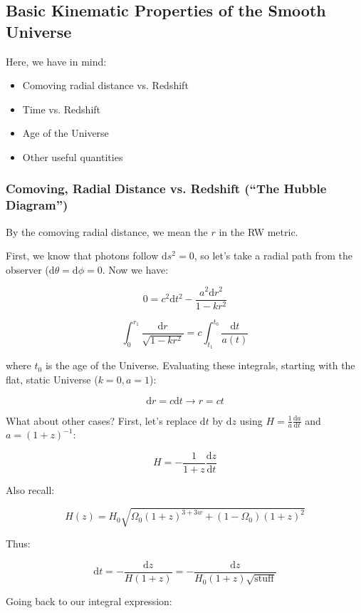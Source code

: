 \documentclass{article}
\newcommand{\be}{\begin{equation}}
\newcommand{\ee}{\end{equation}}
\begin{document}
\subsection{Basic Kinematic Properties of the Smooth Universe}

Here, we have in mind:

\begin{itemize}
    \item Comoving radial distance vs. Redshift
    \item Time vs. Redshift
    \item Age of the Universe
    \item Other useful quantities
\end{itemize}

\subsubsection{Comoving, Radial Distance vs. Redshift (``The Hubble Diagram'')}

By the comoving radial distance, we mean the $r$ in the RW metric. 

First, we know that photons follow $\mathrm{d}s^2 = 0$, so let's take a radial path from the observer ($\mathrm{d}\theta = \mathrm{d}\phi = 0$. Now we have:

\be
0 = c^2 \mathrm{d}t^2 - \frac{a^2 \mathrm{d}r^2}{1-kr^2}
\ee

\be
\int_{0}^{r_1} \frac{\mathrm{d}r}{\sqrt{1-kr^2}} = c\int_{t_1}^{t_0} \frac{\mathrm{d}t}{a(t)}
\ee

where $t_0$ is the age of the Universe. Evaluating these integrals, starting with the flat, static Universe ($k=0, a=1$):

\be
\mathrm{d}r = c \mathrm{d}t \rightarrow r = ct
\ee

What about other cases? First, let's replace $\mathrm{d}t$ by $\mathrm{d}z$ using $H = \frac{1}{a}\frac{\mathrm{d}a}{\mathrm{d}t}$ and $a = (1+z)^{-1}$:

\be
H =-\frac{1}{1+z} \frac{\mathrm{d}z}{\mathrm{d}t}
\ee

Also recall:

\be
H\left(z\right) = H_0 
\sqrt{\Omega_0 \left(1+z\right)^{3+3w} + \left(1-\Omega_0\right)\left(1+z\right)^2}
\ee

Thus:

\be
\mathrm{d}t = - \frac{\mathrm{d}z}{H(1+z)} = -\frac{\mathrm{d}z}{H_0\left(1+z\right)\sqrt{\text{stuff}}}
\ee

Going back to our integral expression:
\end{document}
